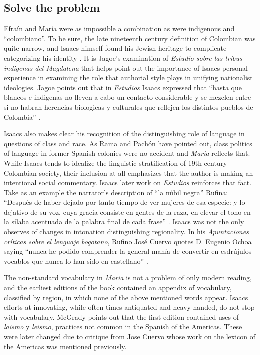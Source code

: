 \documentclass[12pt]{report}\usepackage[]{graphicx}\usepackage[]{color}
\begin{document}
\begin{spacing}{1.9}
\section{Solve the problem}

Efraín and María were as impossible a combination as were indigenous and \enquote{colombiano}.
To be sure, the late nineteenth century definition of Colombian was quite narrow, and Isaacs himself found his Jewish heritage to complicate categorizing his identity \autocite[160]{Jagoe2003}.
It is Jagoe's examination of \textit{Estudio sobre las tribus indigenas del Magdalena} that helps point out the importance of Isaacs personal experience in examining the role that authorial style plays in unifying nationalist ideologies. 
Jagoe points out that in \textit{Estudios} Isaacs expressed that \enquote{hasta que blancos e indigenas no lleven a cabo un contacto considerable y se mezclen entre si no habran herencias biologicas y culturales que reflejen los distintos pueblos de Colombia} \autocite[160]{Jagoe2003}.


Isaacs also makes clear his recognition of the distinguishing role of language in questions of class and race.
As Rama and Pachón have pointed out, class politics of language in former Spanish colonies were no accident and \textit{María} reflects that.
While Isaacs tends to idealize the linguistic stratification of 19th century Colombian society, their inclusion at all emphasizes that the author is making an intentional social commentary.
Isaacs later work on \textit{Estudios} reinforces that fact.
Take as an example the narrator's description of \enquote{la núbil negra} Rufina:
\enquote{Después de haber dejado por tanto tiempo de ver mujeres de esa especie: y lo dejativo de su voz, cuya gracia consiste en gentes de la raza, en elevar el tono en la sílaba acentuada de la palabra final de cada frase} \autocite[304]{Isaacs2012}.
Isaacs was not the only observes of changes in intonation distinguishing regionality.
In his \textit{Apuntaciones críticas sobre el lenguaje bogotano}, Rufino José Cuervo quotes D. Eugenio Ochoa saying \enquote{nunca he podido comprender la general manía de convertir en esdrújulos vocablos que nunca lo han sido en castellano} \autocite[3]{Cuervo1876}.


The non-standard vocabulary in \textit{Maria} is not a problem of only modern reading, and the earliest editions of the book contained an appendix of vocabulary, classified by region, in which none of the above mentioned words appear.
Isaacs efforts at innovating, while often times antiquated and heavy handed, do not stop with vocabulary.
McGrady points out that the first edition contained uses of \textit{laismo} y \textit{leismo}, practices not common in the Spanish of the Americas.
These were later changed due to critique from Jose Cuervo whose work on the lexicon of the Americas was mentioned previously.



\end{spacing}
\end{document}
